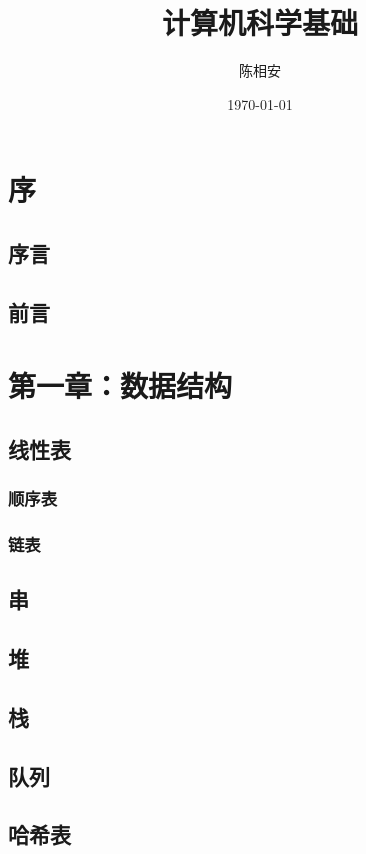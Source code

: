 \documentclass[UTF8]{article}
\title{计算机科学基础}
\author{陈相安}
\date{\today}
\begin{document}
    \maketitle
    \thispagestyle{empty}
    \newpage
    \thispagestyle{empty}
    \tableofcontents
    \thispagestyle{empty}
    \newpage
    \thispagestyle{empty}
    \section{序}
        \subsection{序言}
        \subsection{前言}
    \newpage
    \section{第一章：数据结构}
        \subsection{线性表}
            \subsubsection{顺序表}
            \subsubsection{链表}
        \subsection{串}
        \subsection{堆}
        \subsection{栈}
        \subsection{队列}
        \subsection{哈希表}
\end{document}
